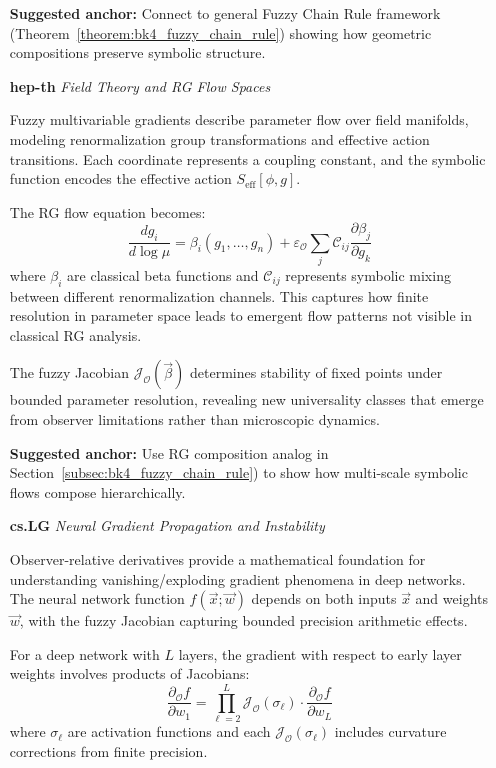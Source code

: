 \begin{itemize}
  \textbf{Suggested anchor:} Connect to general Fuzzy Chain Rule framework (Theorem~\ref{theorem:bk4_fuzzy_chain_rule}) showing how geometric compositions preserve symbolic structure.

  \item[\textbf{hep-th}] \textit{Field Theory and RG Flow Spaces}  
  
  Fuzzy multivariable gradients describe parameter flow over field manifolds, modeling renormalization group transformations and effective action transitions. Each coordinate represents a coupling constant, and the symbolic function encodes the effective action $S_{\text{eff}}[\phi, g]$.
  
  The RG flow equation becomes:
  \[
  \frac{d g_i}{d \log \mu} = \beta_i(g_1, \ldots, g_n) + \varepsilon_{\mathcal{O}} \sum_j \mathcal{C}_{ij} \frac{\partial \beta_j}{\partial g_k}
  \]
  where $\beta_i$ are classical beta functions and $\mathcal{C}_{ij}$ represents symbolic mixing between different renormalization channels. This captures how finite resolution in parameter space leads to emergent flow patterns not visible in classical RG analysis.
  
  The fuzzy Jacobian $\mathcal{J}_{\mathcal{O}}(\vec{\beta})$ determines stability of fixed points under bounded parameter resolution, revealing new universality classes that emerge from observer limitations rather than microscopic dynamics.
  
  \textbf{Suggested anchor:} Use RG composition analog in Section~\ref{subsec:bk4_fuzzy_chain_rule}) to show how multi-scale symbolic flows compose hierarchically.

  \item[\textbf{cs.LG}] \textit{Neural Gradient Propagation and Instability}  
  
  Observer-relative derivatives provide a mathematical foundation for understanding vanishing/exploding gradient phenomena in deep networks. The neural network function $f(\vec{x}; \vec{w})$ depends on both inputs $\vec{x}$ and weights $\vec{w}$, with the fuzzy Jacobian capturing bounded precision arithmetic effects.
  
  For a deep network with $L$ layers, the gradient with respect to early layer weights involves products of Jacobians:
  \[
  \frac{\partial_{\mathcal{O}} f}{\partial w_1} = \prod_{\ell=2}^L \mathcal{J}_{\mathcal{O}}(\sigma_\ell) \cdot \frac{\partial_{\mathcal{O}} f}{\partial w_L}
  \]
  where $\sigma_\ell$ are activation functions and each $\mathcal{J}_{\mathcal{O}}(\sigma_\ell)$ includes curvature corrections from finite precision.
  

\end{itemize}
